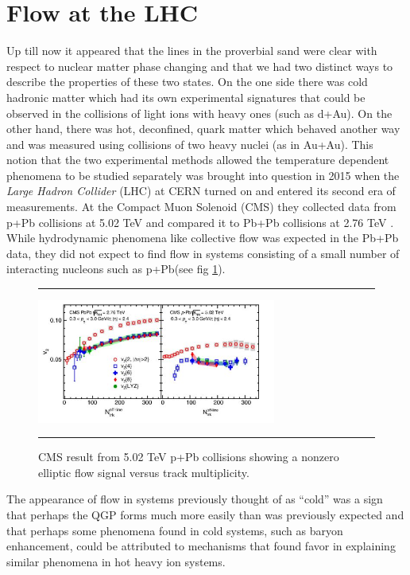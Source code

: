 \section{Flow at the LHC}
Up till now it appeared that the lines in the proverbial sand were clear with respect to nuclear matter phase changing and that we had two distinct ways to describe the properties of these two states. On the one side there was cold hadronic matter which had its own experimental signatures that could be observed in the collisions of light ions with heavy ones (such as d+Au). On the other hand, there was hot, deconfined, quark matter which behaved another way and was measured using collisions of two heavy nuclei (as in Au+Au). This notion that the two experimental methods allowed the temperature dependent phenomena to be studied separately was brought into question in 2015 when the \textit{Large Hadron Collider} (LHC) at CERN turned on and entered its second era of measurements. At the Compact Muon Solenoid (CMS) they collected data from p+Pb collisions at 5.02 TeV and compared it to Pb+Pb collisions at 2.76 TeV \citep{Khachatryan:2015waa}. While hydrodynamic phenomena like collective flow was expected in the Pb+Pb data, they did not expect to find flow in systems consisting of a small number of interacting nucleons such as p+Pb(see fig \ref{fig:pPbflow}).

\begin{figure}[htbp!]
  \centering    \rule{35em}{0.5pt}
    \includegraphics[width=0.7\textwidth]{prevplots/pPbflowLHC.JPG}

  \caption[Elliptic Flow in p+Pb at the LHC]{CMS result from 5.02 TeV p+Pb collisions showing a nonzero elliptic flow signal versus track multiplicity. \citep{Khachatryan:2015waa}}
  \label{fig:pPbflow}    \rule{35em}{0.5pt}
\end{figure} 

The appearance of flow in systems previously thought of as ``cold'' was a sign that perhaps the QGP forms much more easily than was previously expected and that perhaps some phenomena found in cold systems, such as baryon enhancement, could be attributed to mechanisms that found favor in explaining similar phenomena in hot heavy ion systems.

